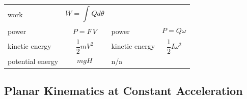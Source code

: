\documentclass[
]{book}
\begin{document}
\begin{longtable}[]{@{}llll@{}}
\begin{minipage}[t]{0.19\columnwidth}
work\strut
\end{minipage} & \begin{minipage}[t]{0.31\columnwidth}\raggedright
\[W = \int_{}^{}{Qd\theta}\]\strut
\end{minipage}\tabularnewline
\begin{minipage}[t]{0.17\columnwidth}\raggedright
power\strut
\end{minipage} & \begin{minipage}[t]{0.21\columnwidth}\raggedright
\[P = F\,V\]\strut
\end{minipage} & \begin{minipage}[t]{0.19\columnwidth}\raggedright
power\strut
\end{minipage} & \begin{minipage}[t]{0.31\columnwidth}\raggedright
\[P = Q \omega\]\strut
\end{minipage}\tabularnewline
\begin{minipage}[t]{0.17\columnwidth}\raggedright
kinetic energy\strut
\end{minipage} & \begin{minipage}[t]{0.21\columnwidth}\raggedright
\[\frac{1}{2} mV^2\]\strut
\end{minipage} & \begin{minipage}[t]{0.19\columnwidth}\raggedright
kinetic energy\strut
\end{minipage} & \begin{minipage}[t]{0.31\columnwidth}\raggedright
\[\frac{1}{2} I \omega^2\]\strut
\end{minipage}\tabularnewline
\begin{minipage}[t]{0.17\columnwidth}\raggedright
potential energy\strut
\end{minipage} & \begin{minipage}[t]{0.21\columnwidth}\raggedright
\[mgH\]\strut
\end{minipage} & \begin{minipage}[t]{0.19\columnwidth}\raggedright
n/a\strut
\end{minipage} & \begin{minipage}[t]{0.31\columnwidth}\raggedright
\strut
\end{minipage}\tabularnewline
\bottomrule
\end{longtable}

\hypertarget{planar-kinematics-at-constant-acceleration}{%
\subsection{Planar Kinematics at Constant Acceleration}\label{planar-kinematics-at-constant-acceleration}}
\end{document}
